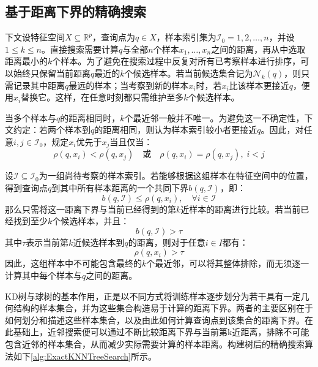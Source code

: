 \subsection{基于距离下界的精确搜索}
下文设特征空间$X\subseteq\mathbb{R}^{p}$，查询点为$q\in X$，样本索引集为$\mathcal{I}_0={1,2,\dots,n}$，并设$1\leqslant k\leqslant n$。直接搜索需要计算$q$与全部$n$个样本$x_1,\dots,x_n$之间的距离，再从中选取距离最小的$k$个样本。为了避免在搜索过程中反复对所有已考察样本进行排序，可以始终只保留当前距离$q$最近的$k$个候选样本。若当前候选集合记为$\mathcal{N}_k(q)$，则只需记录其中距离$q$最远的样本；当考察到新的样本$x_i$时，若$x_i$比该样本更接近$q$，便用$x_i$替换它。这样，在任意时刻都只需维护至多$k$个候选样本。\par
当多个样本与$q$的距离相同时，$k$个最近邻一般并不唯一。为避免这一不确定性，下文约定：若两个样本到$q$的距离相同，则认为样本索引较小者更接近$q$。因此，对任意$i,j\in\mathcal{I}_0$，规定$x_i$优先于$x_j$当且仅当：
\begin{equation*}
	\rho(q,x_i)<\rho(q,x_j)\quad\text{或}\quad\rho(q,x_i)=\rho(q,x_j),\;i<j
\end{equation*}\par
设$\mathcal{I}\subseteq\mathcal{I}_0$为一组尚待考察的样本索引。若能够根据这组样本在特征空间中的位置，得到查询点$q$到其中所有样本距离的一个共同下界$b(q,\mathcal{I})$，即：
\begin{equation*}
	b(q,\mathcal{I})\leqslant\rho(q,x_i),\quad\forall i\in\mathcal{I}
\end{equation*}
那么只需将这一距离下界与当前已经得到的第$k$近样本的距离进行比较。若当前已经找到至少$k$个候选样本，并且：
\begin{equation*}
	b(q,\mathcal{I})>\tau
\end{equation*}
其中$\tau$表示当前第$k$近候选样本到$q$的距离，则对于任意$i\in I$都有：
\begin{equation*}
	\rho(q,x_i)>\tau
\end{equation*}
因此，这组样本中不可能包含最终的$k$个最近邻，可以将其整体排除，而无须逐一计算其中每个样本与$q$之间的距离。\par
KD树与球树的基本作用，正是以不同方式将训练样本逐步划分为若干具有一定几何结构的样本集合，并为这些集合构造易于计算的距离下界。两者的主要区别在于如何划分和描述这些样本集合，以及由此如何计算查询点到该集合的距离下界。在此基础上，近邻搜索便可以通过不断比较距离下界与当前第k近距离，排除不可能包含近邻的样本集合，从而减少实际需要计算的样本距离。构建树后的精确搜索算法如下\cref{alg:ExactKNNTreeSearch}所示。
